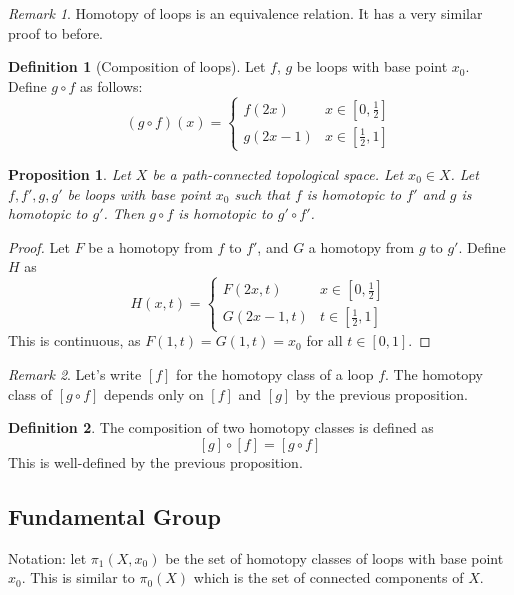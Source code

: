 \documentclass{article}
\theoremstyle{definition}
\newtheorem{defn}{Definition}[section]
\theoremstyle{plain}%
\newtheorem{prop}[thm]{Proposition}
\theoremstyle{remark}
\newtheorem*{rem}{Remark}
\begin{document}
\begin{rem}
    Homotopy of loops is an equivalence relation. It has a very similar proof to before.
\end{rem}

\begin{defn}[Composition of loops]
    Let $f$, $g$ be loops with base point $x_0$. Define $g \circ f$ as follows:
    \[(g \circ f)(x) = \begin{cases} f(2x) &x \in [0, \frac{1}{2}] \\ g(2x-1) &x\in [\frac{1}{2}, 1] \end{cases}\]
\end{defn}

\begin{prop}
    Let $X$ be a path-connected topological space. Let $x_0 \in X$. Let $f, f', g, g'$ be loops with base point $x_0$ such that $f$ is homotopic to $f'$ and $g$ is homotopic to $g'$. Then $g \circ f$ is homotopic to $g' \circ f'$.
\end{prop}

\begin{proof}
     Let $F$ be a homotopy from $f$ to $f'$, and $G$ a homotopy from $g$ to $g'$. Define $H$ as
     \[H(x,t) = \begin{cases} F(2x, t) &x \in [0, \frac{1}{2}] \\ G(2x-1, t) &t \in [\frac{1}{2}, 1] \end{cases}\]
     This is continuous, as $F(1, t) = G(1, t) = x_0$ for all $t \in [0,1]$.
\end{proof}

\begin{rem}
    Let's write $[f]$ for the homotopy class of a loop $f$. The homotopy class of $[g \circ f]$ depends only on $[f]$ and $[g]$ by the previous proposition.
\end{rem}

\begin{defn}
    The composition of two homotopy classes is defined as
    \[[g] \circ [f] = [g \circ f]\]
    This is well-defined by the previous proposition.
\end{defn}

\subsection{Fundamental Group}

Notation: let $\pi_1(X, x_0)$ be the set of homotopy classes of loops with base point $x_0$. This is similar to $\pi_0(X)$ which is the set of connected components of $X$.
\end{document}
